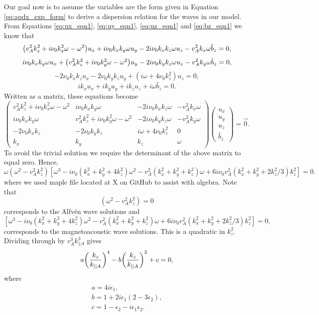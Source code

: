 Our goal now is to assume the variables are the form given in Equation \eqref{eq:apdx_exp_form} to derive a dispersion relation for the waves in our model. From Equations \eqref{eq:ux_eqn1}, \eqref{eq:uy_eqn1}, \eqref{eq:uz_eqn1} and \eqref{eq:bz_eqn1} we know that
\[\qty(v_A^2k_z^2 + i\nu_0 k_x^2 \omega  -\omega^2)u_x + i\nu_0 k_xk_y\omega u_y - 2i\nu_0 k_xk_z\omega u_z - v_A^2 k_x \omega \hat{b}_z = 0,\]
\[i\nu_0 k_xk_y\omega u_x + \qty(v_A^2k_z^2 + i\nu_0 k_y^2 \omega  -\omega^2)u_y - 2i\nu_0 k_yk_z\omega u_z - v_A^2 k_y \omega \hat{b}_z = 0,\]
\[-2\nu_0 k_xk_z u_x - 2\nu_0 k_y k_z u_y + (i\omega + 4\nu_0 k_z^2)u_z=0,\]
\[ik_x u_x + ik_y u_y + ik_z u_z + i\omega \hat{b}_z = 0.\]
Written as a matrix, these equations become
\[\begin{pmatrix}
v_A^2k_z^2 + i\nu_0 k_x^2 \omega  -\omega^2 & i\nu_0 k_xk_y\omega & -2i\nu_0 k_xk_z\omega & -v_A^2 k_x \omega \\
i\nu_0 k_xk_y\omega & v_A^2k_z^2 + i\nu_0 k_y^2 \omega  -\omega^2 & -2i\nu_0 k_yk_z\omega & -v_A^2 k_y \omega \\
-2\nu_0 k_xk_z & -2\nu_0 k_y k_z & i\omega + 4\nu_0 k_z^2 & 0 \\
k_x & k_y & k_z & \omega
\end{pmatrix}
\begin{pmatrix}
u_x \\
u_y \\
u_z \\
\hat{b}_z
\end{pmatrix}
=\vec{0}.\]
To avoid the trivial solution we require the determinant of the above matrix to equal zero. Hence,
\[\omega(\omega^2 - v_A^2k_z^2)[\omega^3-i\nu_0(k_x^2 + k_y^2 + 4k_z^2)\omega^2 - v_A^2(k_x^2+k_y^2+k_z^2)\omega + 6i\nu_0 v_A^2(k_x^2+k_y^2+2k_z^2/3)k_z^2]=0.\]
where we used maple file located at X on GitHub to assist with algebra.
Note that 
\[(\omega^2 - v_A^2k_z^2)=0\]
corresponds to the Alfv\'en wave solutions and 
\[[\omega^3-i\nu_0(k_x^2 + k_y^2 + 4k_z^2)\omega^2 - v_A^2(k_x^2+k_y^2+k_z^2)\omega + 6i\nu_0 v_A^2(k_x^2+k_y^2+2k_z^2/3)k_z^2]=0,\]
corresponds to the magnetoacoustic wave solutions.
This is a quadratic in $k_z^2$. Dividing through by $v_A^3k_{||A}^3$ gives
\begin{equation}
    a\qty(\frac{k_z}{k_{||A}})^4 - b \qty(\frac{k_z}{k_{||A}})^2 + c = 0,
\end{equation}
where
\begin{gather}
    a = 4i\epsilon_1, \\
    b = 1 + 2i\epsilon_1(2-3\epsilon_2), \\
    c = 1 - \epsilon_2 - i\epsilon_1\epsilon_2.
\end{gather}
